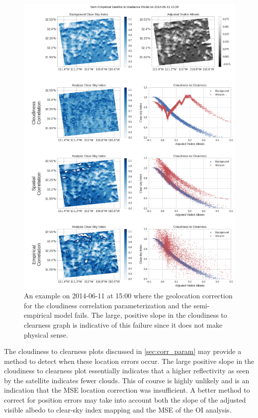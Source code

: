 \begin{figure}[p]
\centering
\includegraphics[width=\textwidth]{figs/cld_to_clear_Semi-Empirical_2014-06-11.png}
\caption[An example of a failure of the geolocation correction]{
  An example on 2014-06-11 at 15:00 where the geolocation correction
  for the cloudiness correlation parameterization and the
  semi-empirical model fails. The large, positive slope in the
  cloudiness to clearness graph is indicative of this failure since it
  does not make physical sense.}
\label{fig:parallax_err}
\end{figure}

The cloudiness to clearness plots discussed in \cref{sec:corr_param}
may provide a method to detect when these location errors occur.
The large positive slope in the cloudiness to clearness plot
essentially indicates that a higher reflectivity as seen by the
satellite indicates fewer clouds.
This of course is highly unlikely and is an indication that the MSE
location correction was insufficient.
A better method to correct for position errors may take into account
both the slope of the adjusted visible albedo to clear-sky index
mapping and the MSE of the OI analysis.


